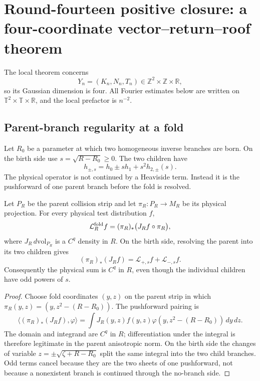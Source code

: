 
\section{Round-fourteen positive closure: a four-coordinate vector--return--roof theorem}
\label{sec:r14-a2}

The local theorem concerns
\[
 Y_n=(K_n,N_n,T_n)
 \in\mathbb Z^2\times\mathbb Z\times\mathbb R ,
\]
so its Gaussian dimension is four.  All Fourier estimates below are written
on \(\mathbb T^2\times\mathbb T\times\mathbb R\), and the local prefactor is
\(n^{-2}\).

\subsection{Parent-branch regularity at a fold}

Let \(R_0\) be a parameter at which two homogeneous inverse branches are born.
On the birth side use \(s=\sqrt{R-R_0}\ge0\).  The two children have
\[
 h_{\pm,s}=h_0\pm s h_1+s^2h_{2,\pm}(s).
\]
The physical operator is not continued by a Heaviside term.  Instead it is
the pushforward of one parent branch before the fold is resolved.

\begin{lemma}
\label{lem:r14-a2-fold}
Let \(P_R\) be the parent collision strip and let
\(\pi_R:P_R\to M_R\) be its physical projection.  For every physical test
distribution \(f\),
\[
 \mathcal L_R^{\rm fold}f
 =(\pi_R)_*\bigl(J_R f\circ\pi_R\bigr),
\]
where \(J_R\,d\mathrm{vol}_{P_R}\) is a \(C^q\) density in \(R\).
On the birth side, resolving the parent into its two children gives
\[
 (\pi_R)_*(J_Rf)
 =\mathcal L_{+,s}f+\mathcal L_{-,s}f .
\]
Consequently the physical sum is \(C^q\) in \(R\), even though the individual
children have odd powers of \(s\).
\end{lemma}

\begin{proof}
Choose fold coordinates \((y,z)\) on the parent strip in which
\(\pi_R(y,z)=(y,z^2-(R-R_0))\).  The pushforward pairing is
\[
 \langle(\pi_R)_*(J_Rf),\varphi\rangle
 =\int J_R(y,z)f(y,z)\varphi(y,z^2-(R-R_0))\,dy\,dz .
\]
The domain and integrand are \(C^q\) in \(R\); differentiation under the
integral is therefore legitimate in the parent anisotropic norm.  On the
birth side the changes of variable \(z=\pm\sqrt{\zeta+R-R_0}\) split the same
integral into the two child branches.  Odd terms cancel because they are the
two sheets of one pushforward, not because a nonexistent branch is continued
through the no-branch side.
\end{proof}


